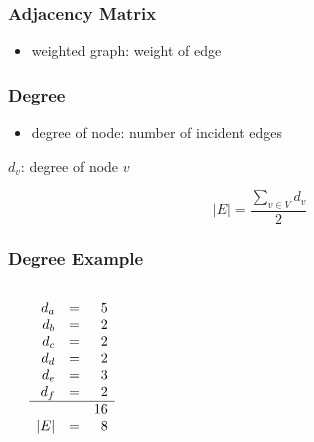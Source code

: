 \documentclass[dvipsnames]{beamer}
\begin{document}
\begin{frame}
  \frametitle{Adjacency Matrix}

  \begin{itemize}
    \item weighted graph: weight of edge
  \end{itemize}
\end{frame}


\begin{frame}
  \frametitle{Degree}

  \begin{itemize}
    \item \alert{degree} of node: number of incident edges
  \end{itemize}

  \pause
  \begin{theorem}
    $d_v$: degree of node $v$

    \[ |E| = \frac{\sum_{v \in V} d_v}{2} \]
  \end{theorem}
\end{frame}

\begin{frame}
  \frametitle{Degree Example}

  \begin{columns}
    \begin{center}
    \end{center}

    $\begin{array}{rcr}
    d_a & = & 5\\
    d_b & = & 2\\
    d_c & = & 2\\
    d_d & = & 2\\
    d_e & = & 3\\
    d_f & = & 2\\\hline
        &   & 16\\
    \medskip
    |E| & = & 8
    \end{array}$
  \end{columns}
\end{frame}
\end{document}
